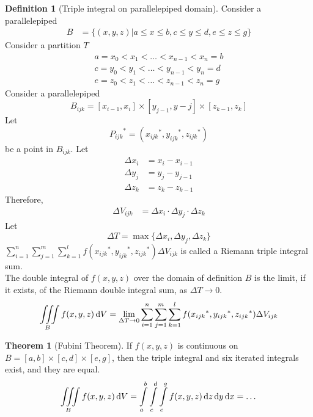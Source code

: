 \documentclass[fleqn, a4paper, 12pt]{article}
\theoremstyle{definition}
\newtheorem{definition}{Definition}
\theoremstyle{theorem}
\newtheorem{theorem}{Theorem}
\theoremstyle{remark}
\begin{document}
\begin{definition}[Triple integral on parallelepiped domain]
	Consider a parallelepiped
	\begin{align*}
		B &= \{(x,y,z) | a \leq x \leq b, c \leq y \leq d, e \leq z \leq g\}
	\end{align*}
	Consider a partition $T$
	\begin{gather*}
		a = x_0 < x_1 < \dots < x_{n - 1} < x_n = b\\
		c = y_0 < y_1 < \dots < y_{n - 1} < y_n = d\\
		e = z_0 < z_1 < \dots < z_{n - 1} < z_n = g
	\end{gather*}
	Consider a parallelepiped
	\begin{equation*}
		B_{ijk} = [x_{i-1}, x_i] \times [y_{j-1}, y-j] \times [z_{k-1}, z_k]
	\end{equation*}
	Let 
	\begin{equation*}
		{P_{ijk}}^* = \left( {x_{ijk}}^*, {y_{ijk}}^*, {z_{ijk}}^* \right)
	\end{equation*}
	be a point in $B_{ijk}$.
	Let 
	\begin{align*}
		\Delta x_i &= x_i - x_{i-1}\\
		\Delta y_j &= y_j - y_{j-1}\\
		\Delta z_k &= z_k - z_{k-1}
	\end{align*}
	Therefore,
	\begin{align*}
		\Delta V_{ijk} &= \Delta x_i \cdot \Delta y_j \cdot \Delta z_k
	\end{align*}
	Let
	\begin{equation*}
		\Delta T = \max\{\Delta x_i, \Delta y_j, \Delta z_k\}
	\end{equation*}
	$\displaystyle \sum_{i = 1}^{n} \sum_{j = 1}^{m} \sum_{k = 1}^{l} f({x_{ijk}}^*, {y_{ijk}}^*, {z_{ijk}}^*) \Delta V_{ijk}$ is called a Riemann triple integral sum.\\
	The double integral of $f(x,y,z)$ over the domain of definition $B$ is the limit, if it exists, of the Riemann double integral sum, as $\Delta T \to 0$.
	\begin{equation*}
	\iiint\limits_{B} f(x,y,z) \dif V = \lim\limits_{\Delta T \to 0} \sum_{i = 1}^{n} \sum_{j = 1}^{m} \sum_{k = 1}^{l} f({x_{ijk}}^*, {y_{ijk}}^*, {z_{ijk}}^*) \Delta V_{ijk}
	\end{equation*}
\end{definition}

\begin{theorem}[Fubini Theorem]
	If $f(x,y,z)$ is continuous on $B = [a,b] \times [c,d] \times [e,g]$, then the triple integral and six iterated integrals exist, and they are equal.
	\begin{equation*}
		\iiint\limits_{B} f(x,y,z) \dif V = \int\limits_{a}^{b} \int\limits_{c}^{d} \int\limits_{e}^{g} f(x,y,z) \dif z \dif y \dif x = \dots
	\end{equation*}
\end{theorem}
\end{document}
